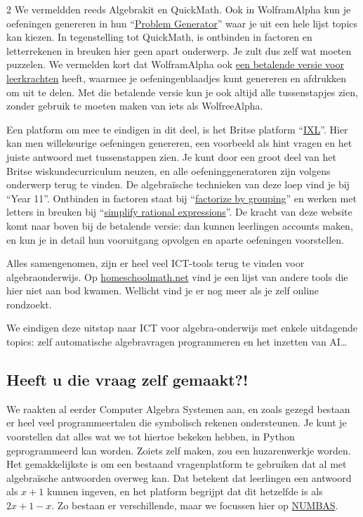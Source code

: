 \begin{multicols} {2}
    We vermeldden reeds Algebrakit en QuickMath.
    Ook in WolframAlpha kun je oefeningen genereren in hun ``\href{https://www.wolframalpha.com/problem-generator/?scrollTo=Algebra}{Problem Generator}'' waar je uit een hele lijst topics kan kiezen.
    In tegenstelling tot QuickMath, is ontbinden in factoren en letterrekenen in breuken hier geen apart onderwerp.
    Je zult dus zelf wat moeten puzzelen.
    We vermelden kort dat WolframAlpha ook \href{https://www.wolframalpha.com/pro/pricing/educators/}{een betalende versie voor leerkrachten} heeft, waarmee je oefeningenblaadjes kunt genereren en afdrukken om uit te delen.
    Met die betalende versie kun je ook altijd alle tussenstapjes zien, zonder gebruik te moeten maken van iets als WolfreeAlpha.
    
    Een platform om mee te eindigen in dit deel, is het Britse platform ``\href{https://uk.ixl.com/maths/algebra}{IXL}''.
    Hier kan men willekeurige oefeningen genereren, een voorbeeld als hint vragen en het juiste antwoord met tussenstappen zien.
    Je kunt door een groot deel van het Britse wiskundecurriculum neuzen, en alle oefeninggeneratoren zijn volgens onderwerp terug te vinden.
    De algebraïsche technieken van deze loep vind je bij ``Year 11''.
    Ontbinden in factoren staat bij ``\href{https://uk.ixl.com/maths/year-11/factorise-by-grouping}{factorize by grouping}'' en werken met letters in breuken bij ``\href{https://uk.ixl.com/maths/year-11/simplify-rational-expressions}{simplify rational expressions}''.
    De kracht van deze website komt naar boven bij de betalende versie: dan kunnen leerlingen accounts maken, en kun je in detail hun vooruitgang opvolgen en aparte oefeningen voorstellen.

    Alles samengenomen, zijn er heel veel ICT-tools terug te vinden voor algebraonderwijs.
    Op \href{https://www.homeschoolmath.net/online/curricula.php}{homeschoolmath.net} vind je een lijst van andere tools die hier niet aan bod kwamen.
    Wellicht vind je er nog meer als je zelf online rondzoekt.

    We eindigen deze uitstap naar ICT voor algebra-onderwijs met enkele uitdagende topics: zelf automatische algebravragen programmeren en het inzetten van AI\ldots

    \subsection{Heeft u die vraag zelf gemaakt?!}
    We raakten al eerder Computer Algebra Systemen aan, en zoals gezegd bestaan er heel veel programmeertalen die symbolisch rekenen ondersteunen.
    Je kunt je voorstellen dat alles wat we tot hiertoe bekeken hebben, in Python geprogrammeerd kan worden.
    Zoiets zelf maken, zou een huzarenwerkje worden.
    Het gemakkelijkste is om een bestaand vragenplatform te gebruiken dat al met algebraïsche antwoorden overweg kan.
    Dat betekent dat leerlingen een antwoord als \(x+1\) kunnen ingeven, en het platform begrijpt dat dit hetzelfde is als \(2x+1-x\).
    Zo bestaan er verschillende, maar we focussen hier op \href{https://www.numbas.org.uk/}{NUMBAS}.
    

\end{multicols}
